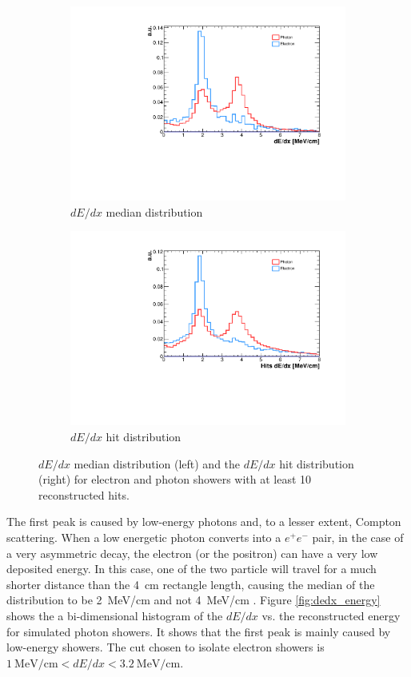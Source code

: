 \begin{figure}[htbp]
\centering
  \begin{subfigure}{0.45\textwidth}
    \includegraphics[width=\linewidth]{figures/dedx.pdf}
    \caption{$dE/dx$ median distribution} 
  \end{subfigure}
    \begin{subfigure}{0.45\textwidth}
    \includegraphics[width=\linewidth]{figures/hits_dedx.pdf}
    \caption{$dE/dx$ hit distribution} 
  \end{subfigure}
  \caption{$dE/dx$ median distribution (left) and the $dE/dx$ hit distribution (right) for electron and photon showers with at least 10 reconstructed hits.}\label{fig:dedx}
\end{figure}


The first peak is caused by low-energy photons and, to a lesser extent, Compton scattering. When a low energetic photon converts into a $e^+e^-$ pair, in the case of a very asymmetric decay, the electron (or the positron) can have a very low deposited energy. In this case, one of the two particle will travel for a much shorter distance than the 4~cm rectangle length, causing the median of the distribution to be 2~MeV/cm and not 4~MeV/cm \cite{caratelli}. Figure \ref{fig:dedx_energy} shows the a bi-dimensional histogram of the $dE/dx$ vs. the reconstructed energy for simulated photon showers. It shows that the first peak is mainly caused by low-energy showers. The cut chosen to isolate electron showers is $1~\mathrm{MeV/cm} < dE/dx < 3.2~\mathrm{MeV/cm}$.


